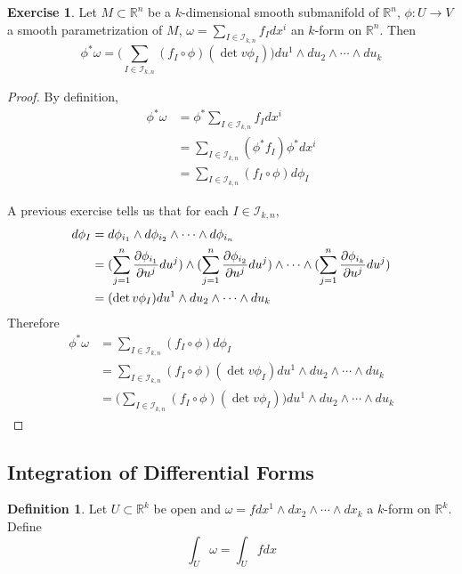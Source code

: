 \documentclass[12pt]{amsart}
\theoremstyle{definition}
\newtheorem{defn}[definition]{Definition}
\newtheorem{ex}[definition]{Exercise}
\newcommand{\om}{\omega}
\newcommand{\R}{\mathbb{R}}
\newcommand{\MI}{\mathcal{I}}
\begin{document}
	\begin{ex}
			Let $M \subset \R^n$ be a $k$-dimensional smooth submanifold of $\R^n$, $\phi: U \rightarrow V$ a smooth parametrization of $M$, $\om = \sum_{I \in \MI_{k,n}} f_Idx^i$  an $k$-form on $\R^n$. Then $$\phi^* \om = \bigg( \sum_{I \in \MI_{k, n}} (f_I \circ \phi) (\det v\phi_I)\bigg)du^1 \wedge du_2 \wedge \cdots \wedge du_k$$ 
	\end{ex}

	\begin{proof}
		By definition,  
		\begin{align*}
			\phi^* \om 
			&= \phi^*  \sum_{I \in \MI_{k,n}} f_Idx^i \\
			&= \sum_{I \in \MI_{k,n}} (\phi^*f_I) \phi^*dx^i \\
			&= \sum_{I \in \MI_{k,n}} (f_I \circ  \phi)  d\phi_I
		\end{align*}
	
	A previous exercise tells us that for each $I \in \MI_{k,n}$,
	\begin{align*}
		d \phi_I 
		&= d\phi_{i_1} \wedge d\phi_{i_2} \wedge \cdots \wedge d \phi_{i_n} \\
		&= (\sum_{j = 1}^n \pdv{\phi_{i_1}}{u^j} du^j) \wedge (\sum_{j = 1}^n \pdv{\phi_{i_2}}{u^j} du^j) \wedge \cdots \wedge (\sum_{j = 1}^n \pdv{\phi_{i_k}}{u^j} du^j)   \\
		&= (\det v\phi_I)du^1 \wedge du_2 \wedge \cdots \wedge du_k
	\end{align*}
	Therefore 
	\begin{align*}
		\phi^* \om
		&= \sum_{I \in \MI_{k,n}} (f_I \circ  \phi)  d\phi_I \\
		&= \sum_{I \in \MI_{k,n}} (f_I \circ  \phi)  (\det v\phi_I)du^1 \wedge du_2 \wedge \cdots \wedge du_k \\
		&= \bigg(\sum_{I \in \MI_{k,n}} (f_I \circ  \phi)  (\det v\phi_I)\bigg)du^1 \wedge du_2 \wedge \cdots \wedge du_k
	\end{align*}
	\end{proof}
	
	\subsection{Integration of Differential Forms}
	
	\begin{defn}
		Let $U \subset \R^k$ be open and $\om = f dx^1 \wedge dx_2 \wedge \cdots \wedge dx_k$ a $k$-form on $\R^k$. Define $$\int_U \om = \int_U f dx$$
	\end{defn}
	
\end{document}
